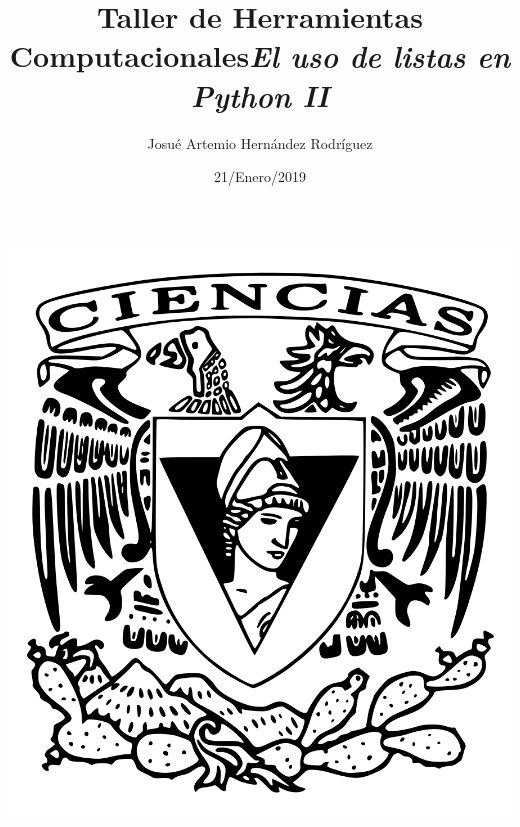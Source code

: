 \documentclass[letterpaper, 12pt,oneside]{article}
\title{\Huge Taller de Herramientas Computacionales}
\author{Josué Artemio Hernández Rodríguez}
\date{21/Enero/2019}
\begin{document}
	\maketitle
	\begin{center}
		\includegraphics[scale=0.2]{2.png}
	\end{center}

	\newpage
	
	\title{\huge \textit{El uso de listas en Python II}}\\
	
\end{document}
